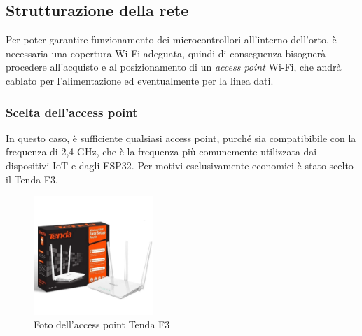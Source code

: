 \documentclass[11pt, a4paper]{article}
\begin{document}
\subsection{Strutturazione della rete}
Per poter garantire funzionamento dei microcontrollori all'interno dell'orto, è 
necessaria una copertura Wi-Fi adeguata, quindi di conseguenza bisognerà procedere
all'acquisto e al posizionamento di un \textit{access point} Wi-Fi, che andrà cablato per l'alimentazione
ed eventualmente per la linea dati.

\subsubsection{Scelta dell'access point}
In questo caso, è sufficiente qualsiasi access point, purché sia compatibibile con
la frequenza di 2,4 GHz, che è la frequenza più comunemente utilizzata dai dispositivi IoT e
dagli ESP32. Per motivi esclusivamente economici è stato scelto il Tenda F3.
\begin{figure}[h!]
    \centering
    \includegraphics[width=0.4\textwidth]{media/router-tenda-f3.jpeg}
    \caption{Foto dell'access point Tenda F3}
    \label{fig:tenda-f3}
\end{figure}
\end{document}
